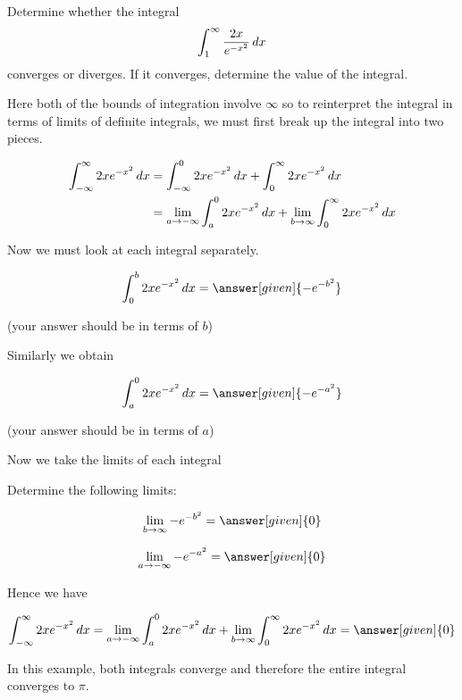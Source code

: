 \documentclass{ximera}
\begin{document}
\begin{example}
Determine whether the integral
\[
\int_{1}^{\infty} \frac{2x}{e^{-x^2}} \mathop{}\!d x
\]
converges or diverges. If it converges, determine the value of the integral.
\begin{explanation}
Here both of the bounds of integration involve $\infty$ so to reinterpret the integral in terms of limits of definite integrals,
we must first break up the integral into two pieces.

\begin{align*}
\int_{-\infty}^{\infty} 2xe^{-x^2} \mathop{}\!d x&= \int_{-\infty}^{0} 2xe^{-x^2} \mathop{}\!d x + \int_{0}^{\infty} 2xe^{-x^2} \mathop{}\!d x \\
& =\lim_{a \to -\infty} \int_{a}^{0} 2xe^{-x^2} \mathop{}\!d x + \lim_{b \to \infty} \int_{0}^{\infty} 2xe^{-x^2} \mathop{}\!d x
\end{align*}

Now we must look at each integral separately.

\[
\int_{0}^{b} 2xe^{-x^2} \d x =  \answer[given]{-e^{-b^2}}
\]
\begin{onlineOnly}
(your answer should be in terms of $b$)
\end{onlineOnly}
Similarly we obtain

\[
\int_{a}^{0} 2xe^{-x^2} \d x= \answer[given]{-e^{-a^2}}
\]
\begin{onlineOnly}
 (your answer should be in terms of $a$)
 \end{onlineOnly}

Now we take the limits of each integral

\begin{question}
Determine the following limits:

 \begin{prompt}
   \[
    \lim_{b\to\infty} -e^{-b^2} = \answer[given]{0}
    \]

\[
\lim_{a \to -\infty} -e^{-a^2}=\answer[given]{0}
\]
  \end{prompt}
\end{question}

Hence we have

\[
\int_{-\infty}^{\infty} 2xe^{-x^2} \d x=\lim_{a \to -\infty} \int_{a}^{0} 2xe^{-x^2} \d x + \lim_{b \to \infty} \int_{0}^{\infty} 2xe^{-x^2} \d x = \answer[given]{0}
\]

In this example, both integrals converge and therefore the entire integral converges to $\pi$.
\end{explanation}
\end{example}
\end{document}
